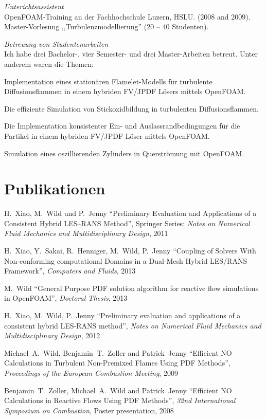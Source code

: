 \documentclass[line,11pt,a4paper]{../resume}
\begin{document}
\begin{resume}
\textsl{Unterichtsassistent}\\
OpenFOAM-Training an der Fachhochschule Luzern, HSLU. (2008 and 2009). \\
Master-Vorlesung ,,Turbulenzmodellierung'' (20 -- 40 Studenten).

\textsl{Betreuung von Studentenarbeiten}\\
Ich habe drei Bachelor-, vier Semester- und drei Master-Arbeiten betreut. Unter
anderem waren die Themen:
\begin{list2}
  \item Implementation eines station\"aren Flamelet-Modells f\"ur turbulente
    Diffusionsflammen in einem hybriden FV/JPDF L\"osers mittels OpenFOAM.
  \item Die effiziente Simulation von Stickoxidbildung in turbulenten
    Diffusionsflammen.
  \item Die Implementation konsistenter Ein- und Auslassrandbedingungen f\"ur
    die Partikel in einem hybriden FV/JPDF L\"oser mittels OpenFOAM.
  \item Simulation eines oszillierenden Zylinders in Querstr\"omung mit
    OpenFOAM.
\end{list2}

\pagebreak
\section{\mysidestyle Publikationen}\vspace{2mm}
H.~Xiao, M.~Wild und P.~Jenny ``Preliminary Evaluation and
Applications of a Consistent Hybrid LES--RANS Method'', Springer Series:
\textsl{Notes on Numerical Fluid Mechanics and Multidisciplinary Design}, 2011

\vspace{-2mm}
H.~Xiao, Y.~Sakai, R.~Henniger, M.~Wild, P.~Jenny
``Coupling of Solvers With Non-conforming computational Domains in a Dual-Mesh
Hybrid LES/RANS Framework'', \textsl{Computers and Fluids}, 2013

M.~Wild
``General Purpose PDF solution algorithm for reactive flow simulations in
OpenFOAM'', \textsl{Doctoral Thesis}, 2013

\vspace{-2mm}
H.~Xiao, M.~Wild, P.~Jenny
``Preliminary evaluation and applications of a consistent hybrid LES-RANS
method'', \textsl{Notes on Numerical Fluid Mechanics and Multidisciplinary
Design}, 2012

\vspace{-2mm}
Michael~A.~Wild, Benjamin~T.~Zoller and Patrick~Jenny
``Efficient $\mathrm{NO}$ Calculations in Turbulent Non-Premixed Flames Using
PDF Methods'', \textsl{Proceedings of the European Combustion Meeting}, 2009

\vspace{-2mm}
Benjamin~T.~Zoller, Michael~A.~Wild and Patrick~Jenny
``Efficient $\mathrm{NO}$ Calculations in Reactive Flows Using PDF Methods'',
\textsl{32nd International Symposium on Combustion}, Poster presentation, 2008



\end{resume}
\end{document}
